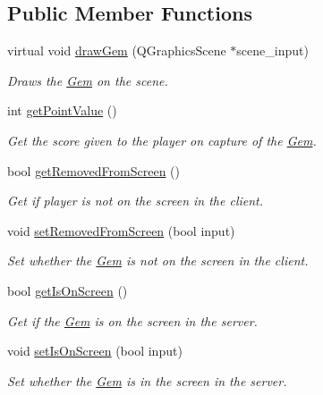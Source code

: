 \subsection*{Public Member Functions}
\begin{DoxyCompactItemize}
\item 
virtual void \hyperlink{classGem_a7b8029d12d3bfd6d2c897f5c0f930c38}{draw\-Gem} (Q\-Graphics\-Scene $\ast$scene\-\_\-input)
\begin{DoxyCompactList}\small\item\em Draws the \hyperlink{classGem}{Gem} on the scene. \end{DoxyCompactList}\item 
int \hyperlink{classGem_a455e97a96da9442751f6ef221712c031}{get\-Point\-Value} ()
\begin{DoxyCompactList}\small\item\em Get the score given to the player on capture of the \hyperlink{classGem}{Gem}. \end{DoxyCompactList}\item 
bool \hyperlink{classGem_ab7735a029b7980d8851f290c0b8c444f}{get\-Removed\-From\-Screen} ()
\begin{DoxyCompactList}\small\item\em Get if player is not on the screen in the client. \end{DoxyCompactList}\item 
void \hyperlink{classGem_a918dd824b208662f8f215cd961638c46}{set\-Removed\-From\-Screen} (bool input)
\begin{DoxyCompactList}\small\item\em Set whether the \hyperlink{classGem}{Gem} is not on the screen in the client. \end{DoxyCompactList}\item 
bool \hyperlink{classGem_a2507142f69f0c99408a0ce779994db9e}{get\-Is\-On\-Screen} ()
\begin{DoxyCompactList}\small\item\em Get if the \hyperlink{classGem}{Gem} is on the screen in the server. \end{DoxyCompactList}\item 
void \hyperlink{classGem_a65b10ba218d11d69dca0477408dc4da8}{set\-Is\-On\-Screen} (bool input)
\begin{DoxyCompactList}\small\item\em Set whether the \hyperlink{classGem}{Gem} is in the screen in the server. \end{DoxyCompactList}\item 

\end{DoxyCompactItemize}
